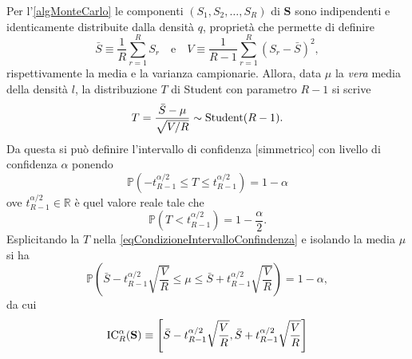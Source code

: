             Per l'\cref{algMonteCarlo} le componenti \((S_1,S_2,\ldots,S_R)\) di \(\mathbf S\) sono indipendenti e identicamente distribuite dalla densità \(q\), proprietà che permette di definire
            \begin{equation*}
                \bar S\equiv\frac1R\sum_{r=1}^RS_r
                \hspace{1em}\text{e}\hspace{1em}
                V\equiv\frac1{R-1}\sum_{r=1}^R(S_r-\bar S)^2,
            \end{equation*}
            rispettivamente la media e la varianza campionarie. Allora, data \(\mu\) la \textit{vera}\footnotemark{} media della densità \(l\), la distribuzione \(T\) di Student con parametro \(R-1\) si scrive%
            \begin{equation*}
                T=\frac{\bar S-\mu}{\sqrt{V/R}}\sim\operatorname{Student}(R-1).
            \end{equation*}
            Da questa si può definire l'intervallo di confidenza [simmetrico] con livello di confidenza \(\alpha\) ponendo
            \begin{equation}
                \label{eqCondizioneIntervalloConfindenza}
                \mathbb P\left(-t_{R-1}^{\alpha/2}\leq T\leq t_{R-1}^{\alpha/2}\right)=1-\alpha
            \end{equation}
            ove \(t_{R-1}^{\alpha/2}\in\mathbb R\) è quel valore reale tale che
            \begin{equation*}
                \mathbb P\left(T<t_{R-1}^{\alpha/2}\right)=1-\frac\alpha2.
            \end{equation*}
            Esplicitando la \(T\) nella \cref{eqCondizioneIntervalloConfindenza} e isolando la media \(\mu\) si ha
            \begin{equation*}
                \mathbb P\left(
                    \bar S-t_{R-1}^{\alpha/2}\sqrt{\frac VR}
                    \leq\mu\leq
                    \bar S+t_{R-1}^{\alpha/2}\sqrt{\frac VR}
                \right)=1-\alpha,
            \end{equation*}
            da cui
            \begin{equation*}
                \operatorname{IC}^\alpha_R(\mathbf S)\equiv\left[
                    \bar S-t_{R-1}^{\alpha/2}\sqrt{\frac VR},
                    \bar S+t_{R-1}^{\alpha/2}\sqrt{\frac VR}
                \right]
            \end{equation*}
